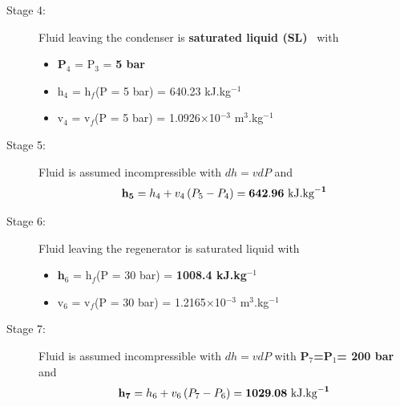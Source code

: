 \documentclass[calculator,steamtables,refrigeranttables,psychrometricchart,datasheet,solutions,resit]{exam}
\begin{document}
\begin{question}
\begin{enumerate}[(a)]
{\begin{description}
\item[Stage 4:] Fluid leaving the condenser is {\bf saturated liquid (SL)}~ with
\begin{itemize}
\item {\bf P$_{4}$} = P$_{3}$ = {\bf 5 bar}~
\item h$_{4}$ = h$_{f}$(P = 5 bar) =  640.23 kJ.kg$^{-1}$
\item v$_{4}$ = v$_{f}$(P = 5 bar) = 1.0926$\times$10$^{-3}$ m$^{3}$.kg$^{-1}$
\end{itemize}

\item[Stage 5:] Fluid is assumed incompressible with $dh = vdP$ and~
\begin{displaymath}
{\bf h_{5}} = h_{4} + v_{4}\left(P_{5}-P_{4}\right) = {\bf 642.96 \text{ kJ.kg}^{-1}}
\end{displaymath}

\item[Stage 6:]  Fluid leaving the regenerator is saturated liquid with
\begin{itemize}
\item {\bf h$_{6}$} = h$_{f}$(P = 30 bar) =  {\bf 1008.4 kJ.kg$^{-1}$}~
\item v$_{6}$ = v$_{f}$(P = 30 bar) = 1.2165$\times$10$^{-3}$ m$^{3}$.kg$^{-1}$
\end{itemize}


\item[Stage 7:]  Fluid is assumed incompressible with $dh = vdP$ with {\bf P$_{7}$=P$_{1}$= 200 bar}~ and
\begin{displaymath}
{\bf h_{7}} = h_{6} + v_{6}\left(P_{7}-P_{6}\right) = {\bf 1029.08 \text{ kJ.kg}^{-1}}
\end{displaymath}~
\end{description}

}
\end{enumerate}
\end{question}
\end{document}
